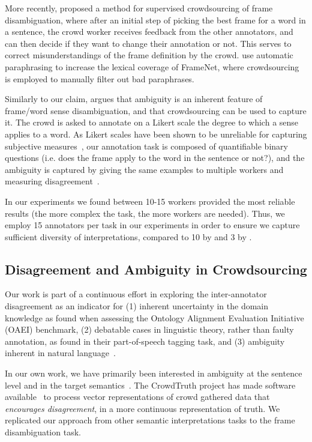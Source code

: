More recently, \citet{chang2015scaling} proposed a method for supervised crowdsourcing of frame disambiguation, where after an initial step of picking the best frame for a word in a sentence, the crowd worker receives feedback from the other annotators, and can then decide if they want to change their annotation or not. This serves to correct misunderstandings of the frame definition by the crowd. \citet{pavlick2015framenet+} use automatic paraphrasing to increase the lexical coverage of FrameNet, where crowdsourcing is employed to manually filter out bad paraphrases.

Similarly to our claim, \citet{jurgens2013embracing} argues that ambiguity is an inherent feature of frame/word sense disambiguation, and that crowdsourcing can be used to capture it. The crowd is asked to annotate on a Likert scale the degree to which a sense applies to a word. As Likert scales have been shown to be unreliable for capturing subjective measures~\cite{Kittur:2008:CUS:1357054.1357127}, our annotation task is composed of quantifiable binary questions (i.e. does the frame apply to the word in the sentence or not?), and the ambiguity is captured by giving the same examples to multiple workers and measuring disagreement~\cite{aroyo2014threesides}.

In our experiments we found between 10-15 workers provided the most reliable results (the more complex the task, the more workers are needed). Thus, we employ 15 annotators per task in our experiments in order to ensure we capture sufficient diversity of  interpretations, compared to 10 by \citet{Hong:2011:GCR:2018966.2018970} and 3 by \citet{jurgens2013embracing}.

\subsection{Disagreement and Ambiguity in Crowdsourcing}

Our work is part of a continuous effort in exploring the inter-annotator disagreement as an indicator for (1) inherent uncertainty in the domain knowledge as \citet{cheatham2014conference} found when assessing the Ontology Alignment Evaluation Initiative (OAEI) benchmark, (2) debatable cases in linguistic theory, rather than faulty annotation, as \citet{plank-hovy-sogaard:2014:P14-2} found in their part-of-speech tagging task, and (3) ambiguity inherent in natural language~\cite{Bayerl2011}.

In our own work, we have primarily been interested in ambiguity at the sentence level and in the target semantics~\cite{DBLP:journals/corr/DumitracheAW17}.  The CrowdTruth project has made software available~\cite{inel2014crowdtruth} to process vector representations of crowd gathered data that \emph{encourages disagreement}, in a more continuous representation of truth. We replicated our  approach from other semantic interpretations tasks to the frame disambiguation task.

